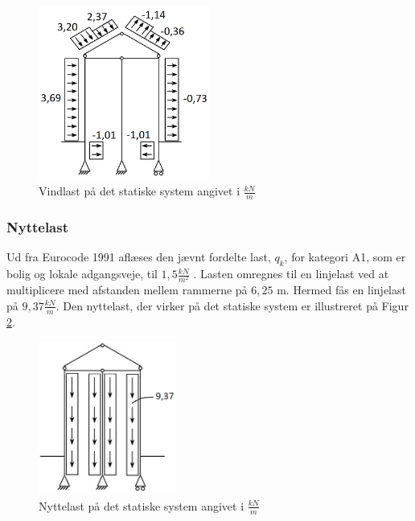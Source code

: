 \begin{figure}[htbp]
	\centering
	\includegraphics[width=0.5\textwidth]{billeder/vindlast.png}
	\caption{Vindlast på det statiske system angivet i $\frac{kN}{m}$}
	\label{fig:vindlast}
\end{figure}

\subsubsection{Nyttelast}
Ud fra Eurocode 1991 aflæses den jævnt fordelte last, $q_k$, for kategori A1, som er bolig og lokale adgangsveje, til $1,\!5 \frac{kN}{m^2}$ \citep[ tabel 6.2 kapitel 6.3.1.2]{EU91}. Lasten omregnes til en linjelast ved at multiplicere med afstanden mellem rammerne på $6,\!25$ m. Hermed fås en linjelast på $9,\!37 \frac{kN}{m}$. 
\newline \indent{     }  Den nyttelast, der virker på det statiske system er illustreret på Figur \ref{fig:nyttelast}.

\begin{figure}[htbp]
	\centering
	\includegraphics[width=0.4\textwidth]{billeder/nyttelast.png}
	\caption{Nyttelast på det statiske system angivet i $\frac{kN}{m}$}
	\label{fig:nyttelast}
\end{figure}

